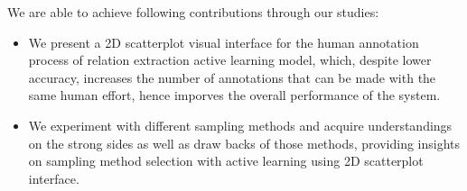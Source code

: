 \documentclass[11pt,a4paper]{article}
\begin{document}
  We are able to achieve following contributions through our studies:

  \begin{itemize}
    \item We present a 2D scatterplot visual interface for the human annotation process of relation extraction active learning model, which, despite lower accuracy, increases the number of annotations that can be made with the same human effort, hence imporves the overall performance of the system.
    \item We experiment with different sampling methods and acquire understandings on the strong sides as well as draw backs of those methods, providing insights on sampling method selection with active learning using 2D scatterplot interface.
  \end{itemize}

  
  
  
  
\end{document}
